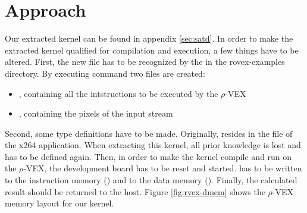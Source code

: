 
\section{Approach}

Our extracted kernel can be found in appendix \ref{sec:satd}. In order to make the extracted kernel qualified for compilation and execution, a few things have to be altered. First, the new file has to be recognized by the  in the rovex-examples directory. By executing  command two files are created:
\begin{itemize}
	\item {}, containing all the intstructions to be executed by the $\rho$-VEX
	\item {}, containing the pixels of the input stream
\end{itemize}

Second, some type definitions have to be made. Originally,  resides in the  file of the x264 application. When extracting this kernel, all prior knowledge is lost and has to be defined again. Then, in order to make the kernel compile and run on the $\rho$-VEX, the development board has to be reset and started.  has to be written to the instruction memory () and  to the data memory (). Finally, the calculated result should be returned to the host. Figure \ref{fig:rvex-dmem} shows the $\rho$-VEX memory layout for our kernel.

